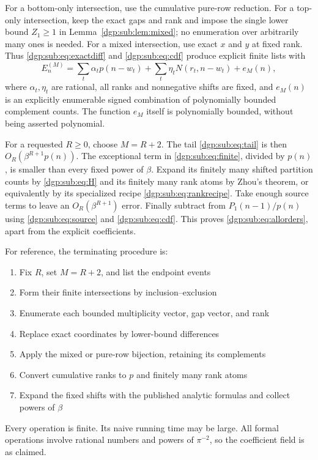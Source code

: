 \documentclass[11pt,letterpaper]{article}
\numberwithin{equation}{section}
\theoremstyle{remark}\newtheorem{remark}[theorem]{Remark}
\begin{document}
For a bottom-only intersection, use the cumulative pure-row
reduction. For a top-only intersection, keep the exact gaps and
rank and impose the single lower bound $Z_1\geq1$ in
Lemma~\ref{dgp:sub:lem:mixed}; no enumeration over arbitrarily many ones
is needed. For a mixed intersection, use exact $x$ and $y$ at
fixed rank. Thus \eqref{dgp:sub:eq:exactdiff} and \eqref{dgp:sub:eq:cdf} produce
explicit finite lists with
\begin{equation}\label{dgp:sub:eq:finite}
 E_n^{(M)}=\sum_t\alpha_t p(n-w_t)
              +\sum_t\eta_t N(r_t,n-w_t)+e_M(n),
\end{equation}
where $\alpha_t,\eta_t$ are rational, all ranks and nonnegative
shifts are fixed, and $e_M(n)$ is an explicitly enumerable signed
combination of polynomially bounded complement counts.
The function $e_M$ itself is polynomially bounded, without being
asserted polynomial.

For a requested $R\geq0$, choose $M=R+2$. The tail
\eqref{dgp:sub:eq:tail} is then $O_R(\beta^{R+1}p(n))$.
The exceptional term in \eqref{dgp:sub:eq:finite}, divided by $p(n)$, is
smaller than every fixed power of $\beta$. Expand its finitely many
shifted partition counts by \eqref{dgp:sub:eq:H} and its finitely many
rank atoms by Zhou's theorem, or equivalently by its specialized
recipe \eqref{dgp:sub:eq:rankrecipe}. Take enough source terms to leave
an $O_R(\beta^{R+1})$ error. Finally subtract from
$P_1(n-1)/p(n)$ using \eqref{dgp:sub:eq:source} and \eqref{dgp:sub:eq:cdf}.
This proves \eqref{dgp:sub:eq:allorders}, apart from the explicit coefficients.

For reference, the terminating procedure is:
\begin{enumerate}
\item Fix $R$, set $M=R+2$, and list the endpoint events
\item Form their finite intersections by inclusion--exclusion
\item Enumerate each bounded multiplicity vector, gap vector, and rank
\item Replace exact coordinates by lower-bound differences
\item Apply the mixed or pure-row bijection, retaining its complements
\item Convert cumulative ranks to $p$ and finitely many rank atoms
\item Expand the fixed shifts with the published analytic formulas
      and collect powers of $\beta$
\end{enumerate}
Every operation is finite. Its naive running time may be large.
All formal operations involve rational numbers and powers of
$\pi^{-2}$, so the coefficient field is as claimed.
\end{document}
